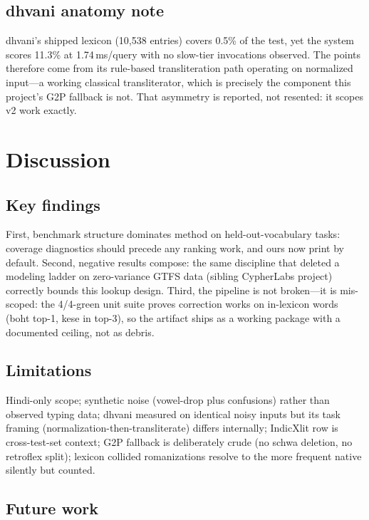 \documentclass[11pt,a4paper]{article}
\begin{document}
\subsection{dhvani anatomy note}

dhvani's shipped lexicon (10,538 entries) covers 0.5\% of the test, yet the system scores 11.3\% at 1.74\,ms/query with no slow-tier invocations observed. The points therefore come from its rule-based transliteration path operating on normalized input---a working classical transliterator, which is precisely the component this project's G2P fallback is not. That asymmetry is reported, not resented: it scopes v2 work exactly.

\section{Discussion}
\label{sec:discussion}

\subsection{Key findings}

First, benchmark structure dominates method on held-out-vocabulary tasks: coverage diagnostics should precede any ranking work, and ours now print by default. Second, negative results compose: the same discipline that deleted a modeling ladder on zero-variance GTFS data (sibling CypherLabs project) correctly bounds this lookup design. Third, the pipeline is not broken---it is mis-scoped: the 4/4-green unit suite proves correction works on in-lexicon words (boht top-1, kese in top-3), so the artifact ships as a working package with a documented ceiling, not as debris.

\subsection{Limitations}

Hindi-only scope; synthetic noise (vowel-drop plus confusions) rather than observed typing data; dhvani measured on identical noisy inputs but its task framing (normalization-then-transliterate) differs internally; IndicXlit row is cross-test-set context; G2P fallback is deliberately crude (no schwa deletion, no retroflex split); lexicon collided romanizations resolve to the more frequent native silently but counted.

\subsection{Future work}
\end{document}
